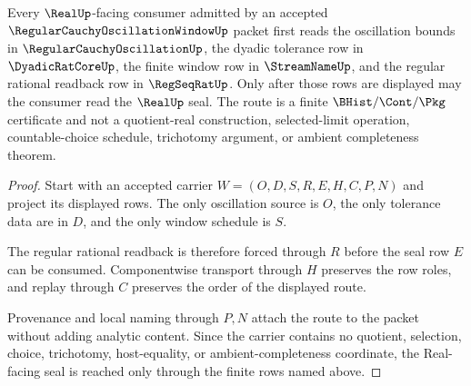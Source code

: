 \begin{theorem}
\label{thm:regular-cauchy-oscillation-window-real-seal-route}
Every $\RealUp$-facing consumer admitted by an accepted $\RegularCauchyOscillationWindowUp$ packet first reads the oscillation bounds in $\RegularCauchyOscillationUp$, the dyadic tolerance row in $\DyadicRatCoreUp$, the finite window row in $\StreamNameUp$, and the regular rational readback row in $\RegSeqRatUp$. Only after those rows are displayed may the consumer read the $\RealUp$ seal. The route is a finite $\BHist/\Cont/\Pkg$ certificate and not a quotient-real construction, selected-limit operation, countable-choice schedule, trichotomy argument, or ambient completeness theorem.
\end{theorem}
\begin{proof}
Start with an accepted carrier $W=(O,D,S,R,E,H,C,P,N)$ and project its displayed rows. The only oscillation source is $O$, the only tolerance data are in $D$, and the only window schedule is $S$.

The regular rational readback is therefore forced through $R$ before the seal row $E$ can be consumed. Componentwise transport through $H$ preserves the row roles, and replay through $C$ preserves the order of the displayed route.

Provenance and local naming through $P,N$ attach the route to the packet without adding analytic content. Since the carrier contains no quotient, selection, choice, trichotomy, host-equality, or ambient-completeness coordinate, the Real-facing seal is reached only through the finite rows named above.
\end{proof}




